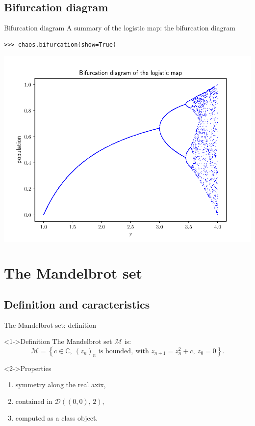 \documentclass[11pt, compress, tikz]{beamer}
\theoremstyle{definition}
\begin{document}
\subsection{Bifurcation diagram}
\begin{frame}[fragile]{Bifurcation diagram}
A summary of the logistic map: the bifurcation diagram
\begin{verbatim}
>>> chaos.bifurcation(show=True)
\end{verbatim}
\begin{center}
    \includegraphics[scale=0.6, clip, trim={0 0 0 1.7cm}]{bifurcation.pdf}
\end{center}
\end{frame}



\section[Mandelbrot]{The Mandelbrot set}
\subsection{Definition and caracteristics}


\begin{frame}{The Mandelbrot set: definition}



\begin{block}<1->{Definition}
The Mandelbrot set $\mathcal{M}$ is:
$$\mathcal{M}=\left\{ c\in\mathbb{C},\ (z_n)_n \text{ is bounded},\ \text{with } z_{n+1}=z_n^2+c,\ z_0=0\right\}.$$
\end{block}
\begin{block}<2->{Properties}
\begin{enumerate}[label=$\bullet$]
\item symmetry along the real axix,
\item contained in $\mathcal{D}((0,0),\, 2)$,
\item computed as a class object.
\end{enumerate}
\end{block}
\end{frame}
\end{document}
